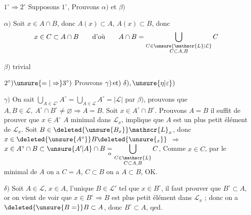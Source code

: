 $1^\circ\Rightarrow 2^\circ$ \quad Supposons $1^\circ$, Prouvons $\alpha)$ et $\beta)$

$\alpha)$ Soit $x\in A\cap B$, donc $A(x)\subset A$, $A(x)\subset B$, donc
\[
 x\in C\subset A\cap B\qquad\text{d'où}\qquad A\cap B=
 \bigcup_{\substack{C\in\unsure{\mathscr{L}|\mathcal{L}}\\C\subset A,B}}C
\]

$\beta)$ trivial

$2^\circ)\unsure{=|\Rightarrow}3^\circ)$ \quad Prouvons $\gamma)\,\text{et})\ \delta),\unsure{\eta|\varepsilon})$

$\gamma)$ On sait $\displaystyle\bigcup_{A\in\mathscr{L}'}A^\circ=\bigcup_{A\in\mathscr{L}}A^\circ=|\mathscr{L}|$ par $\beta)$, prouvons que $A,B\in\mathscr{L},\ A^\circ\cap B^\circ\ne\varnothing\Rightarrow A=B$. Soit $x\in A^\circ\cap B^\circ$. Prouvons $A=B$ il suffit de prouver que $x\in A^\circ$   $A$ minimal dans $\mathscr{L}_x$, implique que $A$ est un plus petit élément de $\mathscr{L}_x$. Soit $B\in\deleted{\unsure{B_x}}\mathscr{L}_x$, donc $x\in\deleted{\unsure{A^\circ}}B\deleted{\unsure{{}_x}}$  $\Rightarrow$ $x\in A^\circ\cap B\subset\unsure{A'|A}\cap B\underset{\alpha}{=}\displaystyle\bigcup_{\substack{C\in\mathscr{L}\\C\subset A,B}} C$,
Comme $x\in C$, par le  minimal de $A$ on a $C=A$,  $C\subset B$ on a $A\subset B$, OK.

$\delta)$ Soit $A\in\mathscr{L}$, $x\in A$,    l'unique $B\in\mathscr{L}'$ tel que $x\in B^\circ$, il faut prouver que $B^\circ\subset A$, or on vient de voir que  $x\in B^\circ\Rightarrow B$ est plus petit élément dans $\mathscr{L}_x$ ; donc on a $\deleted{\unsure{B=}}B\subset A$, donc $B^\circ\subset A$, qed.


